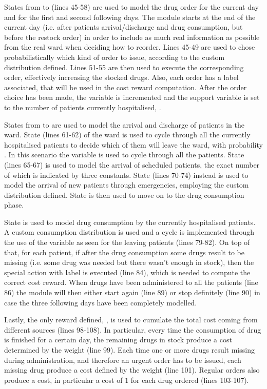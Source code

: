 {      States from  to  (lines 45-58) are used to model the drug order for the current day and for the first and second following days. The module starts at the end of the current day (i.e. after patients arrival/discharge and drug consumption, but before the restock order) in order to include as much real information as possible from the real ward when deciding how to reorder. Lines 45-49 are used to chose probabilistically which kind of order to issue, according to the custom distribution defined. Lines 51-55 are then used to execute the corresponding order, effectively increasing the stocked drugs. Also, each order has a label associated, that will be used in the cost reward computation. After the order choice has been made, the  variable is incremented and the  support variable is set to the number of patients currently hospitalised, .
      
      States from  to  are used to model the arrival and discharge of patients in the ward. State  (lines 61-62) of the ward is used to cycle through all the currently hospitalised patients to decide which of them will leave the ward, with probability . In this scenario the  variable is used to cycle through all the patients. State  (lines 65-67) is used to model the arrival of scheduled patients, the exact number of which is indicated by three constants. State  (lines 70-74) instead is used to model the arrival of new patients through emergencies, employing the custom distribution defined. State  is then used to move on to the drug consumption phase.
      
      State  is used to model drug consumption by the currently hospitalised patients. A custom consumption distribution is used and a cycle is implemented through the use of the  variable as seen for the leaving patients (lines 79-82). On top of that, for each patient, if after the drug consumption some drugs result to be missing (i.e. some drug was needed but there wasn't enough in stock), then the special action with label  is executed (line 84), which is needed to compute the correct cost reward. When drugs have been administered to all the patients (line 86) the module will then either start again (line 89) or stop definitely (line 90) in case the three following days have been completely modelled.
      
      Lastly, the only reward defined, , is used to cumulate the total cost coming from different sources (lines 98-108). In particular, every time the consumption of drug is finished for a certain day, the remaining drugs in stock produce a cost determined by the weight  (line 99). Each time one or more drugs result missing during administration, and therefore an urgent order has to be issued, each missing drug produce a cost defined by the weight  (line 101). Regular orders also produce a cost, in particular a cost of $1$ for each drug ordered (lines 103-107).
    }
